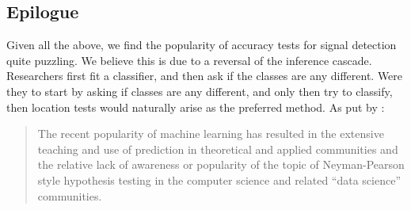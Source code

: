 \documentclass[12pt,a4paper]{article}
\begin{document}
\subsection{Epilogue}
Given all the above, we find the popularity of accuracy tests for signal detection quite puzzling. 
We believe this is due to a reversal of the inference cascade. 
Researchers first fit a classifier, and then ask if the classes are any different.
Were they to start by asking if classes are any different, and only then try to classify, then location tests would naturally arise as the preferred method. 
As put by \cite{ramdas_classification_2016}:
\begin{quote}
The recent popularity of machine learning has resulted in the extensive teaching and use
of prediction in theoretical and applied communities and the relative lack of awareness or
popularity of the topic of Neyman-Pearson style hypothesis testing in the computer science
and related ``data science'' communities.
\end{quote}










\newpage



\appendix
\end{document}
